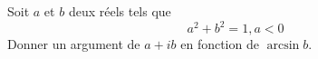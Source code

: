 Soit $a$ et $b$ deux r\'eels tels que
\[a^2+b^2=1, a<0\]
Donner un argument de $a+ib$ en fonction de $\arcsin b$. \bigskip